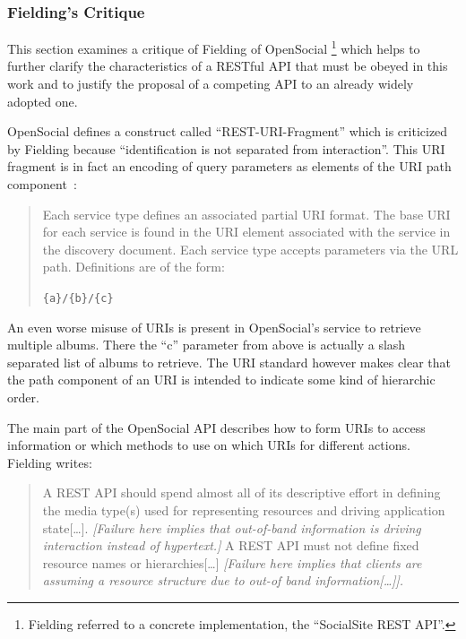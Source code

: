 \documentclass[11pt,a4paper,headsepline,twoside]{scrartcl}		%
\newcommand{\citeurl}[2]{\url{#1} (#2)}
\begin{document}
\subsubsection{Fielding's Critique}
\label{sec:fieldings-critique}

This section examines a critique of Fielding of OpenSocial
\cite{Fielding2008}\footnote{Fielding referred to a concrete implementation, the
  ``SocialSite REST API''.} which helps to further clarify the characteristics
of a RESTful API that must be obeyed in this work and to justify the proposal of
a competing API to an already widely adopted one.

OpenSocial defines a construct called ``REST-URI-Fragment'' which is criticized
by Fielding because ``identification is not separated from interaction''.  This
URI fragment is in fact an encoding of query parameters as elements of the URI
path component~\cite[Core API Server, sec 2.1.1.2.2,
REST-URI-Fragment]{OSSpec2.0.1}:

\begin{quote}
  Each service type defines an associated partial URI format. The base URI for
  each service is found in the URI element associated with the service in the
  discovery document. Each service type accepts parameters via the URL
  path. Definitions are of the form:
  
  \lstinline:{a}/{b}/{c}:
\end{quote}

An even worse misuse of URIs is present in OpenSocial's service to retrieve
multiple albums. There the ``c'' parameter from above is actually a slash
separated list of albums to retrieve. The URI standard however makes clear that
the path component of an URI is intended to indicate some kind of hierarchic
order\cite[sec 3.3]{RFC3986}.


The main part of the OpenSocial API describes how to form URIs to access
information or which methods to use on which URIs for different
actions. Fielding writes:

\begin{quote}
  A REST API should spend almost all of its descriptive effort in defining the
  media type(s) used for representing resources and driving application
  state[\ldots].  \textit{[Failure here implies that out-of-band information is
    driving interaction instead of hypertext.]}  A REST API must not define
  fixed resource names or hierarchies[\ldots] \textit{[Failure here implies that
    clients are assuming a resource structure due to out-of band
    information[\ldots]].}
\end{quote}
\end{document}
